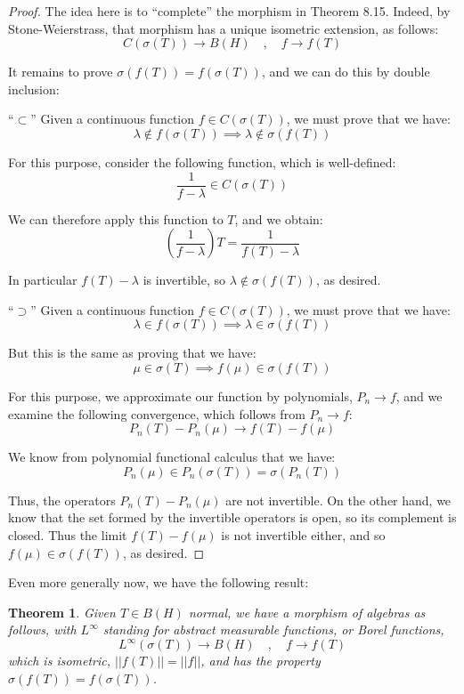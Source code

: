 \documentclass[12pt]{amsbook}
\newtheorem{theorem}{Theorem}[chapter]
\begin{document}
\begin{proof}
The idea here is to ``complete'' the morphism in Theorem 8.15. Indeed, by Stone-Weierstrass, that morphism has a unique isometric extension, as follows:
$$C(\sigma(T))\to B(H)\quad,\quad  
f\to f(T)$$

It remains to prove $\sigma(f(T))=f(\sigma(T))$, and we can do this by double inclusion:

\medskip

``$\subset$'' Given a continuous function $f\in C(\sigma(T))$, we must prove that we have:
$$\lambda\notin f(\sigma(T))\implies\lambda\notin\sigma(f(T))$$

For this purpose, consider the following function, which is well-defined:
$$\frac{1}{f-\lambda}\in C(\sigma(T))$$

We can therefore apply this function to $T$, and we obtain:
$$\left(\frac{1}{f-\lambda}\right)T=\frac{1}{f(T)-\lambda}$$

In particular $f(T)-\lambda$ is invertible, so  $\lambda\notin\sigma(f(T))$, as desired.

\medskip

``$\supset$'' Given a continuous function $f\in C(\sigma(T))$, we must prove that we have: 
$$\lambda\in f(\sigma(T))\implies\lambda\in\sigma(f(T))$$

But this is the same as proving that we have:
$$\mu\in\sigma(T)\implies f(\mu)\in\sigma(f(T))$$

For this purpose, we approximate our function by polynomials, $P_n\to f$, and we examine the following convergence, which follows from $P_n\to f$:
$$P_n(T)-P_n(\mu)\to f(T)-f(\mu)$$

We know from polynomial functional calculus that we have:
$$P_n(\mu)
\in P_n(\sigma(T))
=\sigma(P_n(T))$$

Thus, the operators $P_n(T)-P_n(\mu)$ are not invertible. On the other hand, we know that the set formed by the invertible operators is open, so its complement is closed. Thus the limit $f(T)-f(\mu)$ is not invertible either, and so $f(\mu)\in\sigma(f(T))$, as desired.
\end{proof}

Even more generally now, we have the following result:

\begin{theorem}
Given $T\in B(H)$ normal, we have a morphism of algebras as follows, with $L^\infty$ standing for abstract measurable functions, or Borel functions,
$$L^\infty(\sigma(T))\to B(H)\quad,\quad 
f\to f(T)$$
which is isometric, $||f(T)||=||f||$, and has the property $\sigma(f(T))=f(\sigma(T))$.
\end{theorem}
\end{document}
